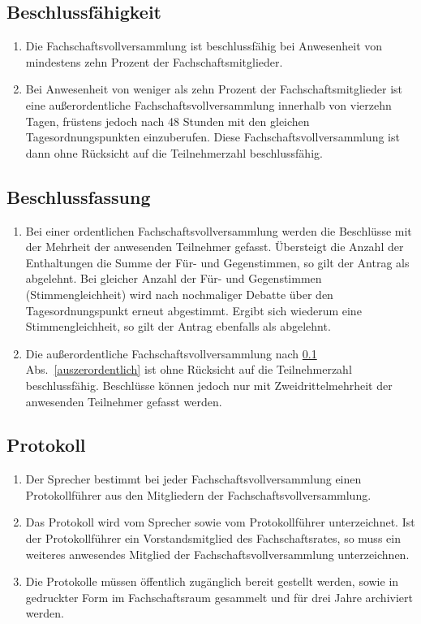 \subsection{Beschlussfähigkeit}
\label{sec:beschlussfaehigkeit}
\begin{enumerate}
\item Die Fachschaftsvollversammlung ist beschlussfähig bei Anwesenheit von mindestens zehn Prozent der Fachschaftsmitglieder.
\item \label{auszerordentlich} Bei Anwesenheit von weniger als zehn Prozent der Fachschaftsmitglieder ist eine außerordentliche Fachschaftsvollversammlung innerhalb von vierzehn Tagen, früstens jedoch nach 48 Stunden mit den gleichen Tagesordnungspunkten einzuberufen. Diese Fachschaftsvollversammlung ist dann ohne Rücksicht auf die Teilnehmerzahl beschlussfähig.
\end{enumerate}

\subsection{Beschlussfassung}
\begin{enumerate}
\item Bei einer ordentlichen Fachschaftsvollversammlung werden die Beschlüsse mit der Mehrheit der anwesenden Teilnehmer gefasst. Übersteigt die Anzahl der Enthaltungen die Summe der Für- und Gegenstimmen, so gilt der Antrag als abgelehnt. Bei gleicher Anzahl der Für- und Gegenstimmen (Stimmengleichheit) wird nach nochmaliger Debatte über den Tagesordnungspunkt erneut abgestimmt. Ergibt sich wiederum eine Stimmengleichheit, so gilt der Antrag ebenfalls als abgelehnt.
\item Die außerordentliche Fachschaftsvollversammlung nach \ref{sec:beschlussfaehigkeit} Abs.~\ref{auszerordentlich} ist ohne Rücksicht auf die Teilnehmerzahl beschlussfähig. Beschlüsse können jedoch nur mit Zweidrittelmehrheit der anwesenden Teilnehmer gefasst werden.
\end{enumerate}

\subsection{Protokoll}
\begin{enumerate}
\item Der Sprecher bestimmt bei jeder Fachschaftsvollversammlung einen Protokollführer aus den Mitgliedern der Fachschaftsvollversammlung.
\item Das Protokoll wird vom Sprecher sowie vom Protokollführer unterzeichnet. Ist der Protokollführer ein Vorstandsmitglied des Fachschaftsrates, so muss ein weiteres anwesendes Mitglied der Fachschaftsvollversammlung unterzeichnen.
\item Die Protokolle müssen öffentlich zugänglich bereit gestellt werden, sowie in gedruckter Form im Fachschaftsraum gesammelt und für drei Jahre archiviert werden.
\end{enumerate}
